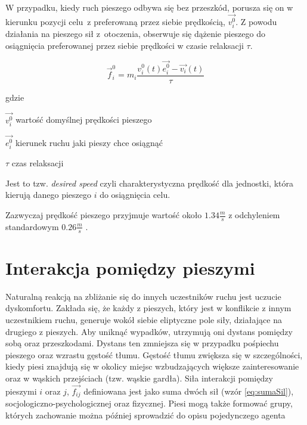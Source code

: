W przypadku, kiedy ruch pieszego odbywa się bez przeszkód, porusza się on w kierunku pozycji celu~z preferowaną przez siebie prędkością, $\vec{v_{i}^{0}}$. Z powodu działania na pieszego sił z~otoczenia, obserwuje się dążenie pieszego do osiągnięcia preferowanej przez siebie prędkości w czasie relaksacji $\tau$.

\begin{equation}
\vec{f}_{i}^{0} = m_{i} \frac{v_{i}^{0}(t) \vec{e_{i}^{0}} - \vec{v_{i}}(t)}{\tau}
\end{equation}

gdzie
\begin{eqwhere}[2cm]
	\item[$\vec{v_{i}^{0}}$] wartość domyślnej prędkości pieszego
	\item[$\vec{e_{i}^{0}}$] kierunek ruchu jaki pieszy chce osiągnąć
	\item[$\tau$] czas relaksacji
\end{eqwhere}
	
Jest to tzw. \textit{desired speed} czyli charakterystyczna prędkość dla jednostki, która kierują danego pieszego $i$ do osiągnięcia celu.

Zazwyczaj prędkość pieszego przyjmuje wartość około $1.34 \frac{m}{s}$ \cite{transporttechnikDerFussganger} z odchyleniem standardowym $0.26 \frac{m}{s}$ \cite{HeBuAjTw}.

\section{Interakcja pomiędzy pieszymi}
\label{sec:interactionBetweenPedestrians}

Naturalną reakcją na zbliżanie się do innych uczestników ruchu jest uczucie dyskomfortu. Zakłada się, że każdy z pieszych, który jest w konflikcie z innym uczestnikiem ruchu, generuje wokół siebie eliptyczne pole siły, działające na drugiego z pieszych. Aby uniknąć wypadków, utrzymują oni dystans pomiędzy sobą oraz przeszkodami. Dystans ten zmniejsza się w przypadku pośpiechu pieszego oraz wzrastu gęstość tłumu. Gęstość tłumu zwiększa się w szczególności, kiedy piesi znajdują się w okolicy miejsc wzbudzających większe zainteresowanie oraz w wąskich przejściach (tzw. wąskie gardła). Siła interakcji pomiędzy pieszymi $i$ oraz $j$, $\vec{f_{ij}}$ definiowana jest jako suma dwóch sił (wzór \ref{eq:sumaSil}), socjologiczno-psychologicznej oraz fizycznej. Piesi mogą także formować grupy, których zachowanie można później sprowadzić do opisu pojedynczego agenta \cite{HeBuAjTw}

